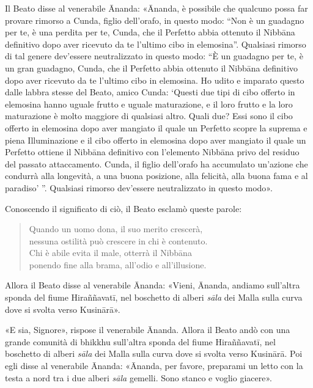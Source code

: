 Il Beato disse al venerabile Ānanda: «Ānanda, è possibile che qualcuno
possa far provare rimorso a Cunda, figlio dell’orafo, in questo modo:
“Non è un guadagno per te, è una perdita per te, Cunda, che il Perfetto
abbia ottenuto il Nibbāna definitivo dopo aver ricevuto da te l’ultimo
cibo in elemosina”. Qualsiasi rimorso di tal genere dev’essere
neutralizzato in questo modo: “È un guadagno per te, è un gran guadagno,
Cunda, che il Perfetto abbia ottenuto il Nibbāna definitivo dopo aver
ricevuto da te l’ultimo cibo in elemosina. Ho udito e imparato questo
dalle labbra stesse del Beato, amico Cunda: ‘Questi due tipi di cibo
offerto in elemosina hanno uguale frutto e uguale maturazione, e il loro
frutto e la loro maturazione è molto maggiore di qualsiasi altro. Quali
due? Essi sono il cibo offerto in elemosina dopo aver mangiato il quale
un Perfetto scopre la suprema e piena Illuminazione e il cibo offerto in
elemosina dopo aver mangiato il quale un Perfetto ottiene il Nibbāna
definitivo con l’elemento Nibbāna privo del residuo del passato
attaccamento. Cunda, il figlio dell’orafo ha accumulato un’azione che
condurrà alla longevità, a una buona posizione, alla felicità, alla
buona fama e al paradiso’ ”. Qualsiasi rimorso dev’essere neutralizzato
in questo modo».


Conoscendo il significato di ciò, il Beato esclamò queste parole:


\begin{quote}
Quando un uomo dona, il suo merito crescerà, \\
nessuna ostilità può crescere in chi è contenuto. \\
Chi è abile evita il male, otterrà il Nibbāna \\
ponendo fine alla brama, all’odio e all’illusione.
\end{quote}



Allora il Beato disse al venerabile Ānanda: «Vieni, Ānanda, andiamo
sull’altra sponda del fiume Hiraññavatī, nel boschetto di alberi \emph{sāla}
dei Malla sulla curva dove si svolta verso Kusinārā».


«E sia, Signore», rispose il venerabile Ānanda. Allora il Beato andò con
una grande comunità di bhikkhu sull’altra sponda del fiume Hiraññavatī,
nel boschetto di alberi \emph{sāla} dei Malla sulla curva dove si svolta
verso Kusinārā. Poi egli disse al venerabile Ānanda: «Ānanda, per
favore, preparami un letto con la testa a nord tra i due alberi \emph{sāla}
gemelli. Sono stanco e voglio giacere».


